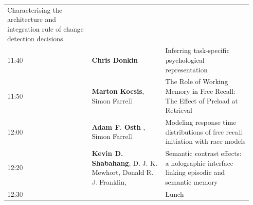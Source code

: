 \documentclass[]{article}
\begin{document}
\begin{longtable}[]{@{}lll@{}}
\begin{minipage}[t]{0.53\columnwidth}
Characterising the architecture and integration rule of change detection
decisions\strut
\end{minipage}\tabularnewline
\begin{minipage}[t]{0.03\columnwidth}\raggedright\strut
11:40\strut
\end{minipage} & \begin{minipage}[t]{0.35\columnwidth}\raggedright\strut
\textbf{Chris Donkin}\strut
\end{minipage} & \begin{minipage}[t]{0.53\columnwidth}\raggedright\strut
Inferring task-specific psychological representation\strut
\end{minipage}\tabularnewline
\begin{minipage}[t]{0.03\columnwidth}\raggedright\strut
11:50\strut
\end{minipage} & \begin{minipage}[t]{0.35\columnwidth}\raggedright\strut
\textbf{Marton Kocsis}, Simon Farrell\strut
\end{minipage} & \begin{minipage}[t]{0.53\columnwidth}\raggedright\strut
The Role of Working Memory in Free Recall: The Effect of Preload at
Retrieval\strut
\end{minipage}\tabularnewline
\begin{minipage}[t]{0.03\columnwidth}\raggedright\strut
12:00\strut
\end{minipage} & \begin{minipage}[t]{0.35\columnwidth}\raggedright\strut
\textbf{Adam F. Osth} , Simon Farrell\strut
\end{minipage} & \begin{minipage}[t]{0.53\columnwidth}\raggedright\strut
Modeling response time distributions of free recall initiation with race
models\strut
\end{minipage}\tabularnewline
\begin{minipage}[t]{0.03\columnwidth}\raggedright\strut
12:20\strut
\end{minipage} & \begin{minipage}[t]{0.35\columnwidth}\raggedright\strut
\textbf{Kevin D. Shabahang}, D. J. K. Mewhort, Donald R. J.
Franklin,\strut
\end{minipage} & \begin{minipage}[t]{0.53\columnwidth}\raggedright\strut
Semantic contrast effects: a holographic interface linking episodic and
semantic memory\strut
\end{minipage}\tabularnewline
\begin{minipage}[t]{0.03\columnwidth}\raggedright\strut
12:30\strut
\end{minipage} & \begin{minipage}[t]{0.35\columnwidth}\raggedright\strut
\strut
\end{minipage} & \begin{minipage}[t]{0.53\columnwidth}\raggedright\strut
Lunch\strut
\end{minipage}\tabularnewline
\bottomrule
\end{longtable}
\end{document}

